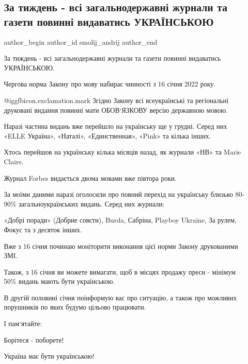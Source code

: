  
 
 
 
 
 
\subsection{За тиждень - всі загальнодержавні журнали та газети повинні видаватись УКРАЇНСЬКОЮ}
\label{sec:09_01_2022.fb.smolij_andrij.1.zhurnaly_mova}
 
\ifcmt
 author_begin
   author_id smolij_andrij
 author_end
\fi

За тиждень - всі загальнодержавні журнали та газети повинні видаватись
УКРАЇНСЬКОЮ.

Чергова норма Закону про мову набирає чинності з 16 січня 2022 року.

@igg{fbicon.exclamation.mark} Згідно Закону всі всеукраїнські та регіональні
друковані видання повинні мати ОБОВ‘ЯЗКОВУ версію державною мовою. 


Наразі частина видань вже перейшло на українську ще у грудні. Серед них «ELLE
Україна», «Наталі», «Единственная», «Pink» та кілька інших. 

Хтось перейшов на українську кілька місяців назад, як журнали «НВ» та Marie
Claire. 

Журнал Forbes видається двома мовами вже півтора роки.

За моїми даними наразі оголосили про повний перехід на українську близько
80-90\% загальноукраїнських видань. Серед них журнали:

«Добрі поради» (Добрие совєти), Burda, Сабріна, Playboy Ukraine, За рулем,
Фокус та з десяток інших. 

Вже з 16 січня починаю моніторити виконання цієї норми Закону друкованими ЗМІ. 

Також, з 16 січня ви можете вимагати, щоб в місцях продажу преси - мінімум 50\%
видань мають бути українською. 

В другій половині січня поінформую вас про ситуацію, а також про можливих
порушників по яких будумо цільово працювати.

І пам‘ятайте: 

Борітеся - поборете! 

Україна має бути українською!
